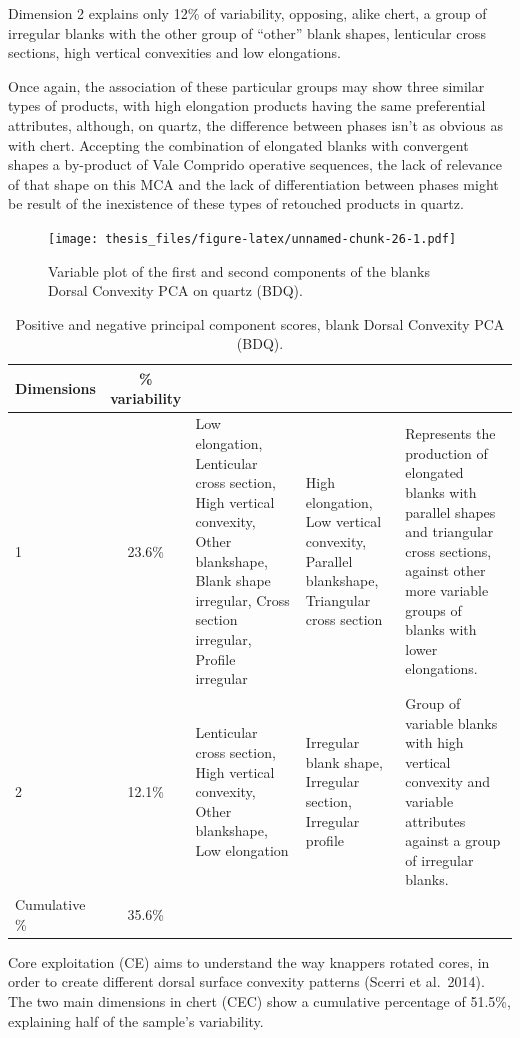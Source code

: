 \documentclass[12pt,twoside]{reedthesis}
\begin{document}
Dimension 2 explains only 12\% of variability, opposing, alike chert, a group of irregular blanks with the other group of ``other'' blank shapes, lenticular cross sections, high vertical convexities and low elongations.

Once again, the association of these particular groups may show three similar types of products, with high elongation products having the same preferential attributes, although, on quartz, the difference between phases isn't as obvious as with chert.
Accepting the combination of elongated blanks with convergent shapes a by-product of Vale Comprido operative sequences, the lack of relevance of that shape on this MCA and the lack of differentiation between phases might be result of the inexistence of these types of retouched products in quartz.
\begin{figure}
\centering
\texttt{[image: thesis\_files/figure-latex/unnamed-chunk-26-1.pdf]}
\caption{\label{fig:unnamed-chunk-26}Variable plot of the first and second components of the blanks Dorsal Convexity PCA on quartz (BDQ).}
\end{figure}
\begin{table}[!h]

\caption{\label{tab:unnamed-chunk-27}Positive and negative principal component scores, blank Dorsal Convexity PCA (BDQ).}
\centering
\begin{tabular}[t]{lc>{\raggedright\arraybackslash}p{3cm}>{\raggedright\arraybackslash}p{3cm}>{\raggedright\arraybackslash}p{3cm}}
\toprule
\multicolumn{1}{c}{\textbf{Dimensions}} & \multicolumn{1}{c}{\textbf{\% variability}} & \multicolumn{1}{>{\centering\arraybackslash}p{3cm}}{\textbf{+}} & \multicolumn{1}{>{\centering\arraybackslash}p{3cm}}{\textbf{-}} & \multicolumn{1}{>{\centering\arraybackslash}p{3cm}}{\textbf{Interpretation}}\\
\midrule
1 & 23.6\% & Low elongation, Lenticular cross section, High vertical convexity, Other blankshape,
                              Blank shape irregular, Cross section irregular, Profile irregular & High elongation, Low vertical convexity, Parallel blankshape, Triangular cross section & Represents the production of elongated blanks with parallel shapes and triangular cross sections,
                               against other more variable groups of blanks with lower elongations.\\
2 & 12.1\% & Lenticular cross section, High vertical convexity, Other blankshape, Low elongation & Irregular blank shape, Irregular section, Irregular profile & Group of variable blanks with high vertical convexity and variable attributes against a group of irregular blanks.\\
Cumulative \% & 35.6\% &  &  & \\
\bottomrule
\end{tabular}
\end{table}
Core exploitation (CE) aims to understand the way knappers rotated cores, in order to create different dorsal surface convexity patterns (Scerri et al.~2014). The two main dimensions in chert (CEC) show a cumulative percentage of 51.5\%, explaining half of the sample's variability.
\end{document}
